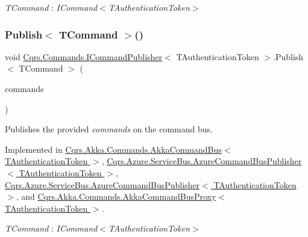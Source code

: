 \begin{Desc}
\item[Type Constraints]\begin{description}
\item[{\em T\+Command} : {\em I\+Command$<$T\+Authentication\+Token$>$}]\end{description}
\end{Desc}
\mbox{\label{interfaceCqrs_1_1Commands_1_1ICommandPublisher_af0f033c0b949e5650032e4f00b11b595_af0f033c0b949e5650032e4f00b11b595}} 
\subsubsection{\texorpdfstring{Publish$<$ T\+Command $>$()}{Publish< TCommand >()}\hspace{0.1cm}{\footnotesize\ttfamily [2/2]}}
{\footnotesize\ttfamily void \hyperlink{interfaceCqrs_1_1Commands_1_1ICommandPublisher}{Cqrs.\+Commands.\+I\+Command\+Publisher}$<$ T\+Authentication\+Token $>$.Publish$<$ T\+Command $>$ (\begin{DoxyParamCaption}\item[{I\+Enumerable$<$ T\+Command $>$}]{commands }\end{DoxyParamCaption})}



Publishes the provided {\itshape commands}  on the command bus. 



Implemented in \hyperlink{classCqrs_1_1Akka_1_1Commands_1_1AkkaCommandBus_ab52365375febd74ac078e97af6e6cd24_ab52365375febd74ac078e97af6e6cd24}{Cqrs.\+Akka.\+Commands.\+Akka\+Command\+Bus$<$ T\+Authentication\+Token $>$}, \hyperlink{classCqrs_1_1Azure_1_1ServiceBus_1_1AzureCommandBusPublisher_a072f18c8709e0ae61056e34251afc506_a072f18c8709e0ae61056e34251afc506}{Cqrs.\+Azure.\+Service\+Bus.\+Azure\+Command\+Bus\+Publisher$<$ T\+Authentication\+Token $>$}, \hyperlink{classCqrs_1_1Azure_1_1ServiceBus_1_1AzureCommandBusPublisher_a072f18c8709e0ae61056e34251afc506_a072f18c8709e0ae61056e34251afc506}{Cqrs.\+Azure.\+Service\+Bus.\+Azure\+Command\+Bus\+Publisher$<$ T\+Authentication\+Token $>$}, and \hyperlink{classCqrs_1_1Akka_1_1Commands_1_1AkkaCommandBusProxy_a81dc8162ca933d84b6aee04aff589010_a81dc8162ca933d84b6aee04aff589010}{Cqrs.\+Akka.\+Commands.\+Akka\+Command\+Bus\+Proxy$<$ T\+Authentication\+Token $>$}.

\begin{Desc}
\item[Type Constraints]\begin{description}
\item[{\em T\+Command} : {\em I\+Command$<$T\+Authentication\+Token$>$}]\end{description}
\end{Desc}

